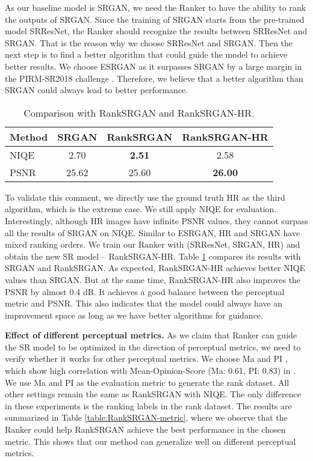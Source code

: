 \documentclass[10pt,twocolumn,letterpaper]{article}
\begin{document}
As our baseline model is SRGAN, we need the Ranker to have the ability to rank the outputs of SRGAN. Since the training of SRGAN starts from the pre-trained model SRResNet, the Ranker should recognize the results between SRResNet and SRGAN. That is the reason why we choose SRResNet and SRGAN. Then the next step is to find a better algorithm that could guide the model to achieve better results. We choose ESRGAN as it surpasses SRGAN by a large margin in the PIRM-SR2018 challenge \cite{blau20182018}. Therefore, we believe that a better algorithm than SRGAN could always lead to better performance. 
\vskip -0.1cm

\begin{table}[h]
\renewcommand\tabcolsep{2.0pt}
\small
\setlength{\abovecaptionskip}{-0.2cm}
\setlength{\belowcaptionskip}{-0.3cm}
\begin{center}
\begin{tabular}{l|ccc}
\hline\hline
Method &SRGAN&RankSRGAN&RankSRGAN-HR \\
\hline
NIQE&2.70&\textbf{2.51}&2.58\\
PSNR&25.62&25.60&\textbf{26.00}\\
\hline
\end{tabular}
\end{center}
\caption{Comparison with RankSRGAN and RankSRGAN-HR.}
\label{table:RankSRGAN-HR}
\end{table}

To validate this comment, we directly use the ground truth HR as the third algorithm, which is the extreme case. We still apply NIQE for evaluation. Interestingly, although HR images have infinite PSNR values, they cannot surpass all the results of SRGAN on NIQE. Similar to ESRGAN, HR and SRGAN have mixed ranking orders. We train our Ranker with (SRResNet, SRGAN, HR) and obtain the new SR model -- RankSRGAN-HR. Table \ref{table:RankSRGAN-HR} compares its results with SRGAN and RankSRGAN. As expected, RankSRGAN-HR achieves better NIQE values than SRGAN. But at the same time, RankSRGAN-HR also improves the PSNR by almost 0.4 dB. It achieves a good balance between the perceptual metric and PSNR. This also indicates that the model could always have an improvement space as long as we have better algorithms for guidance. 



\textbf{Effect of different perceptual metrics.} As we claim that Ranker can guide the SR model to be optimized in the direction of perceptual metrics, we need to verify whether it works for other perceptual metrics. We choose Ma \cite{martin2001database} and PI \cite{blau20182018}, which show high correlation with Mean-Opinion-Score (Ma: 0.61, PI: 0.83) in \cite{blau20182018}. We use Ma and PI as the evaluation metric to generate the rank dataset. All other settings remain the same as RankSRGAN with NIQE. The only difference in these experiments is the ranking labels in the rank dataset. The results are summarized in Table \ref{table:RankSRGAN-metric}, where we observe that the Ranker could help RankSRGAN achieve the best performance in the chosen metric. This shows that our method can generalize well on different perceptual metrics.
\end{document}

